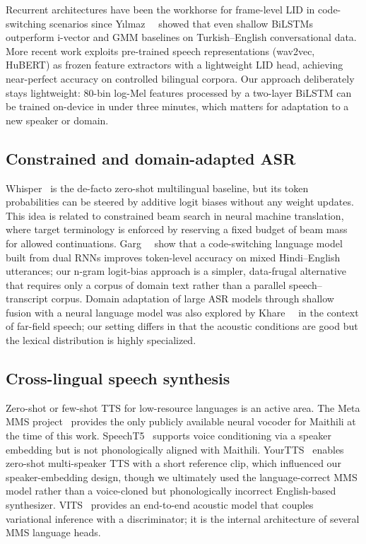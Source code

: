 \documentclass[10pt,twocolumn,letterpaper]{article}
\begin{document}
Recurrent architectures have been the workhorse for frame-level LID in
code-switching scenarios since Y{\i}lmaz~\etal~\cite{yilmaz2016detecting}
showed that even shallow BiLSTMs outperform i-vector and GMM baselines
on Turkish--English conversational data.  More recent work exploits
pre-trained speech representations (wav2vec, HuBERT) as frozen
feature extractors with a lightweight LID head, achieving near-perfect
accuracy on controlled bilingual corpora.  Our approach deliberately
stays lightweight: 80-bin log-Mel features processed by a two-layer
BiLSTM can be trained on-device in under three minutes, which matters
for adaptation to a new speaker or domain.

\subsection{Constrained and domain-adapted ASR}
Whisper~\cite{radford2023whisper} is the de-facto zero-shot multilingual
baseline, but its token probabilities can be steered by additive
logit biases without any weight updates.  This idea is related to
constrained beam search in neural machine translation, where target
terminology is enforced by reserving a fixed budget of beam mass for
allowed continuations.  Garg~\etal~\cite{garg2018code} show that a
code-switching language model built from dual RNNs improves token-level
accuracy on mixed Hindi--English utterances; our n-gram logit-bias
approach is a simpler, data-frugal alternative that requires only a
corpus of domain text rather than a parallel speech--transcript
corpus.  Domain adaptation of large ASR models through shallow fusion
with a neural language model was also explored by
Khare~\etal~\cite{khare2021asr} in the context of far-field speech;
our setting differs in that the acoustic conditions are good but the
lexical distribution is highly specialized.

\subsection{Cross-lingual speech synthesis}
Zero-shot or few-shot TTS for low-resource languages is an active area.
The Meta MMS project~\cite{pratap2023mms} provides the only publicly
available neural vocoder for Maithili at the time of this work.
SpeechT5~\cite{ao2021speecht5} supports voice conditioning via a
speaker embedding but is not phonologically aligned with Maithili.
YourTTS~\cite{casanova2022yourtts} enables zero-shot multi-speaker
TTS with a short reference clip, which influenced our speaker-embedding
design, though we ultimately used the language-correct MMS model
rather than a voice-cloned but phonologically incorrect English-based
synthesizer.  VITS~\cite{kim2021vits} provides an end-to-end acoustic
model that couples variational inference with a discriminator; it is
the internal architecture of several MMS language heads.
\end{document}
